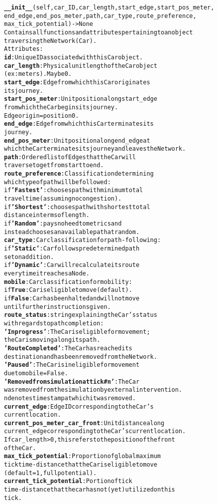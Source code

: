 \begin{alltt}
\textbf{__init__}(self, car_ID, car_length, start_edge, start_pos_meter,
end_edge, end_pos_meter, path, car_type, route_preference,
max_tick_potential) -> None
Contains all functions and attributes pertaining to an object 
traversing the Network (Car).
Attributes:
    \textbf{id}:  Unique ID associated with this Car object.
    \textbf{car_length}:  Physical unit length of the Car object 
    (ex: meters).  May be 0.
    \textbf{start_edge}:  Edge from which this Car originates 
    its journey.
    \textbf{start_pos_meter}:  Unit position along start_edge 
    from which the Car begins its journey.  
    Edge origin = position 0.
    \textbf{end_edge}:  Edge from which this Car terminates its 
    journey.
    \textbf{end_pos_meter}:  Unit position along end_edge at 
    which the Car terminates its journey and leaves the Network.
    \textbf{path}:  Ordered list of Edges that the Car will 
    traverse to get from start to end.
    \textbf{route_preference}:  Classification determining 
    which type of path will be followed:
        if \textbf{'Fastest'}: chooses path with minimum total 
        travel time (assuming no congestion).
        if \textbf{'Shortest'}: chooses path with shortest total 
        distance in terms of length.
        if \textbf{'Random'}:  pays no heed to metrics and 
        instead chooses an available path at random.
    \textbf{car_type}:  Car classification for path-following:
        if \textbf{'Static'}:  Car follows predetermined path 
        set on addition.
        if \textbf{'Dynamic'}:  Car will recalculate its route 
        every time it reaches a Node. 
    \textbf{mobile}:  Car classification for mobility:
        if \textbf{True}:  Car is eligible to move (default).
        if \textbf{False}:  Car has been halted and will not move 
        until further instructions given.
    \textbf{route_status}:  string explaining the Car's status 
    with regards to path completion:
        \textbf{'In progress'}:  The Car is eligible for movement; 
        the Car is moving along its path.
        \textbf{'Route Completed'}:  The Car has reached its 
        destination and has been removed from the Network.
        \textbf{'Paused'}:  The Car is ineligible for movement 
        due to mobile=False.
        \textbf{'Removed from simulation at tick #n'}:  The Car 
        was removed from the simulation by external intervention.  
        n denotes timestamp at which it was removed.
    \textbf{current_edge}:  Edge ID corresponding to the Car's 
    current location.
    \textbf{current_pos_meter_car_front}:  Unit distance along
    current_edge corresponding to the Car's current location.  
    If car_length > 0, this refers to the position of the front 
    of the Car.
    \textbf{max_tick_potential}:  Proportion of global maximum 
    tick time-distance that the Car is eligible to move 
    (default = 1, full potential).
    \textbf{current_tick_potential}:  Portion of tick 
    time-distance that the car has not (yet) utilized on this 
    tick.


\end{alltt}
